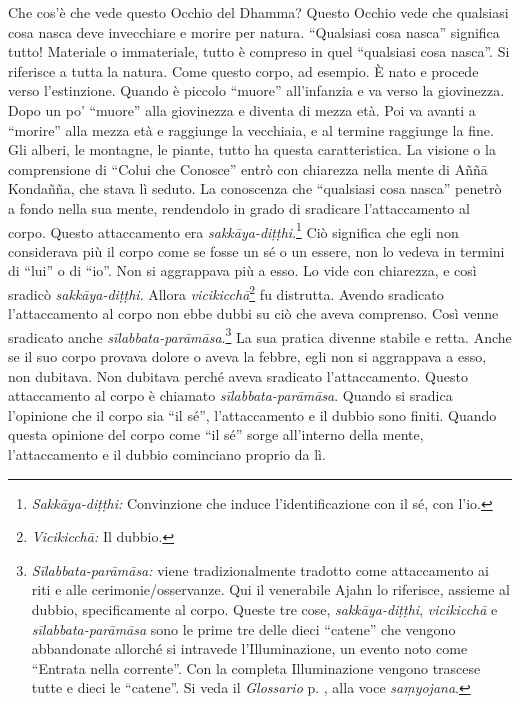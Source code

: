 Che cos'è che vede questo Occhio del Dhamma? Questo Occhio vede che
qualsiasi cosa nasca deve invecchiare e morire per natura. ``Qualsiasi
cosa nasca'' significa tutto! Materiale o immateriale, tutto è compreso
in quel ``qualsiasi cosa nasca''. Si riferisce a tutta la natura. Come
questo corpo, ad esempio. È nato e procede verso l'estinzione. Quando è
piccolo ``muore'' all'infanzia e va verso la giovinezza. Dopo un po'
``muore'' alla giovinezza e diventa di mezza età. Poi va avanti a
``morire'' alla mezza età e raggiunge la vecchiaia, e al termine
raggiunge la fine. Gli alberi, le montagne, le piante, tutto ha questa
caratteristica. La visione o la comprensione di ``Colui che Conosce''
entrò con chiarezza nella mente di Aññā Kondañña, che stava lì seduto.
La conoscenza che ``qualsiasi cosa nasca'' penetrò a fondo nella sua
mente, rendendolo in grado di sradicare l'attaccamento al corpo. Questo
attaccamento era \emph{sakkāya-diṭṭhi}.\footnote{\emph{Sakkāya-diṭṭhi:}
  Convinzione che induce l'identificazione con il sé, con l'io.} Ciò
significa che egli non considerava più il corpo come se fosse un sé o un
essere, non lo vedeva in termini di ``lui'' o di ``io''. Non si
aggrappava più a esso. Lo vide con chiarezza, e così sradicò
\emph{sakkāya-diṭṭhi}. Allora \emph{vicikicchā}\footnote{\emph{Vicikicchā:}
  Il dubbio.} fu distrutta. Avendo sradicato l'attaccamento al corpo non
ebbe dubbi su ciò che aveva comprenso. Così venne sradicato anche
\emph{sīlabbata-parāmāsa}.\footnote{\emph{Sīlabbata-parāmāsa:} viene
  tradizionalmente tradotto come attaccamento ai riti e alle
  cerimonie/osservanze. Qui il venerabile Ajahn lo riferisce, assieme al
  dubbio, specificamente al corpo. Queste tre cose,
  \emph{sakkāya-diṭṭhi}, \emph{vicikicchā} e \emph{sīlabbata-parāmāsa}
  sono le prime tre delle dieci ``catene'' che vengono abbandonate
  allorché si intravede l'Illuminazione, un evento noto come ``Entrata
  nella corrente''. Con la completa Illuminazione vengono trascese tutte
  e dieci le ``catene''. Si veda il \emph{Glossario} p. \pageref{glossary-samyojana}, alla voce
  \emph{saṃyojana}.} La sua pratica divenne stabile e retta. Anche se il
suo corpo provava dolore o aveva la febbre, egli non si aggrappava a
esso, non dubitava. Non dubitava perché aveva sradicato l'attaccamento.
Questo attaccamento al corpo è chiamato \emph{sīlabbata-parāmāsa}.
Quando si sradica l'opinione che il corpo sia ``il sé'', l'attaccamento
e il dubbio sono finiti. Quando questa opinione del corpo come ``il sé''
sorge all'interno della mente, l'attaccamento e il dubbio cominciano
proprio da lì.

